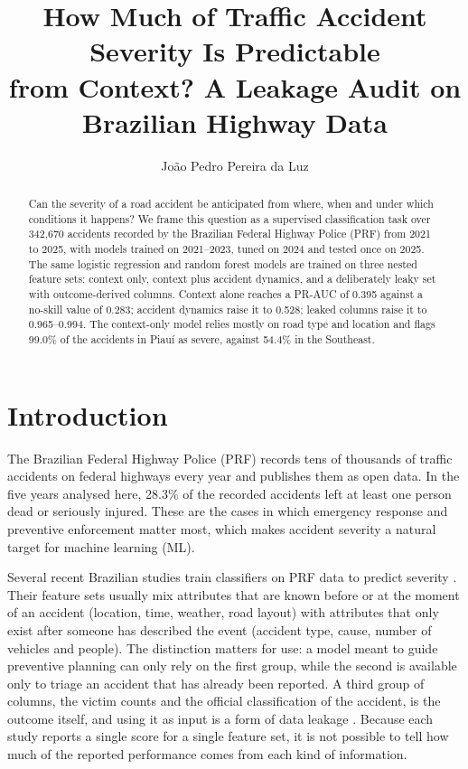 \documentclass[12pt]{article}
\title{How Much of Traffic Accident Severity Is Predictable\\
from Context? A Leakage Audit on Brazilian Highway Data}
\author{Jo\~ao Pedro Pereira da Luz\inst{1}}
\begin{document}
\maketitle

\begin{abstract}
Can the severity of a road accident be anticipated from where, when and under
which conditions it happens? We frame this question as a supervised
classification task over 342,670 accidents recorded by the Brazilian Federal
Highway Police (PRF) from 2021 to 2025, with models trained on 2021--2023,
tuned on 2024 and tested once on 2025. The same logistic regression and random
forest models are trained on three nested feature sets: context only, context
plus accident dynamics, and a deliberately leaky set with outcome-derived
columns. Context alone reaches a PR-AUC of 0.395 against a no-skill value of
0.283; accident dynamics raise it to 0.528; leaked columns raise it to
0.965--0.994. The context-only model relies mostly on road type and location and
flags 99.0\% of the accidents in Piau\'i as severe, against 54.4\% in the
Southeast.
\end{abstract}

\section{Introduction}

The Brazilian Federal Highway Police (PRF) records tens of thousands of traffic
accidents on federal highways every year and publishes them as open data. In the five years
analysed here, 28.3\% of the recorded accidents left at least one person dead
or seriously injured. These are the cases in which emergency response and
preventive enforcement matter most, which makes accident severity a natural
target for machine learning (ML).

Several recent Brazilian studies train classifiers on PRF data to predict
severity \cite{gabardo2025,mafort2025}. Their feature sets usually mix
attributes that are known before or at the moment of an accident (location,
time, weather, road layout) with attributes that only exist after someone has
described the event (accident type, cause, number of vehicles and people). The
distinction matters for use: a model meant to guide preventive planning can
only rely on the first group, while the second is available only to triage an
accident that has already been reported. A third group of columns, the victim
counts and the official classification of the accident, is the outcome itself,
and using it as input is a form of data leakage
\cite{kaufman2012,kapoor2023}. Because each study reports a single score for a
single feature set, it is not possible to tell how much of the reported
performance comes from each kind of information.
\end{document}
